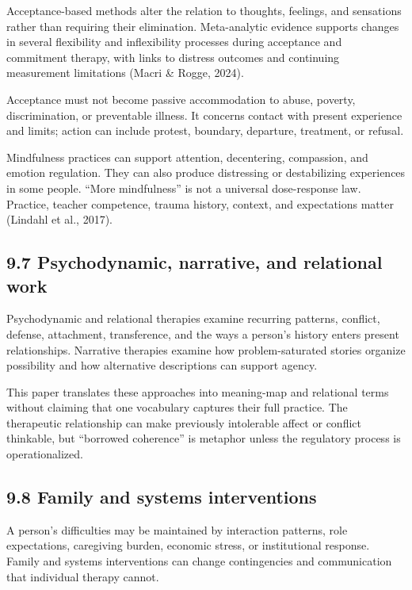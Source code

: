 \documentclass[
  11pt,
]{article}
\begin{document}
Acceptance-based methods alter the relation to thoughts, feelings, and
sensations rather than requiring their elimination. Meta-analytic
evidence supports changes in several flexibility and inflexibility
processes during acceptance and commitment therapy, with links to
distress outcomes and continuing measurement limitations (Macri \&
Rogge, 2024).

Acceptance must not become passive accommodation to abuse, poverty,
discrimination, or preventable illness. It concerns contact with present
experience and limits; action can include protest, boundary, departure,
treatment, or refusal.

Mindfulness practices can support attention, decentering, compassion,
and emotion regulation. They can also produce distressing or
destabilizing experiences in some people. ``More mindfulness'' is not a
universal dose-response law. Practice, teacher competence, trauma
history, context, and expectations matter (Lindahl et al., 2017).

\subsection{9.7 Psychodynamic, narrative, and relational
work}\label{psychodynamic-narrative-and-relational-work}

Psychodynamic and relational therapies examine recurring patterns,
conflict, defense, attachment, transference, and the ways a person's
history enters present relationships. Narrative therapies examine how
problem-saturated stories organize possibility and how alternative
descriptions can support agency.

This paper translates these approaches into meaning-map and relational
terms without claiming that one vocabulary captures their full practice.
The therapeutic relationship can make previously intolerable affect or
conflict thinkable, but ``borrowed coherence'' is metaphor unless the
regulatory process is operationalized.

\subsection{9.8 Family and systems
interventions}\label{family-and-systems-interventions}

A person's difficulties may be maintained by interaction patterns, role
expectations, caregiving burden, economic stress, or institutional
response. Family and systems interventions can change contingencies and
communication that individual therapy cannot.
\end{document}
